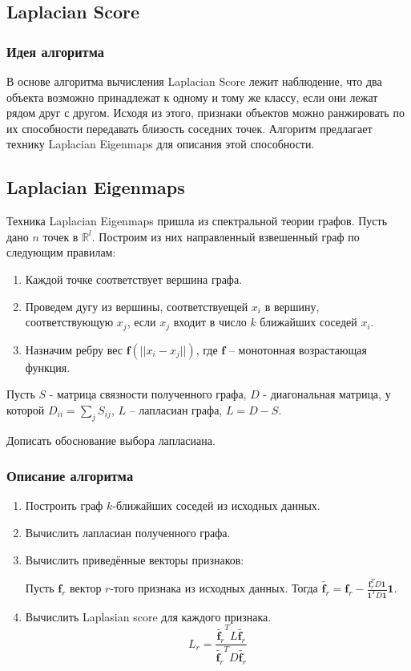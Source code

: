 \subsection{Laplacian Score}

\subsubsection{Идея алгоритма}

В основе алгоритма вычисления Laplacian Score лежит наблюдение, что два объекта возможно принадлежат к одному и тому же классу,
если они лежат рядом друг с другом. Исходя из этого, признаки объектов можно ранжировать по их способности передавать близость соседних точек. Алгоритм предлагает технику Laplacian Eigenmaps для описания этой способности. 

\subsection{Laplacian Eigenmaps}

Техника Laplacian Eigenmaps пришла из спектральной теории графов. Пусть дано $n$ точек в $\mathbb{R}^l$. Построим из них направленный
взвешенный граф по следующим правилам:
\begin{enumerate}
	\item Каждой точке соответствует вершина графа.
	\item Проведем дугу из вершины, соответствуещей $x_i$ в вершину, соответствующую $x_j$, если $x_j$ входит в число $k$ ближайших соседей
	$x_i$.
	\item Назначим ребру вес $\mathbf{f}(||x_i - x_j||)$, где $\mathbf{f}$ -- монотонная возрастающая функция.
\end{enumerate}
Пусть $S$ - матрица связности полученного графа, $D$  - диагональная матрица, у которой $D_{ii} = \sum_j S_{ij}$, $L$ -- лапласиан графа, $L = D-S$. 

Дописать обоснование выбора лапласиана.

\subsubsection{Описание алгоритма}

\begin{enumerate}
	\item Построить граф $k$-ближайших соседей из исходных данных. 
	\item Вычислить лапласиан полученного графа.
	\item Вычислить приведённые векторы признаков: 

	Пусть $\mathbf{f}_r$ вектор $r$-того признака из исходных данных. Тогда $\widetilde{\mathbf{f}_r} = \mathbf{f}_r - \frac{\mathbf{f}_r^T D \mathbf{1}}{\mathbf{1}^T D \mathbf{1}} \mathbf{1}$.
	\item Вычислить Laplasian score для каждого признака.
	\[L_r = \frac{\widetilde{\mathbf{f}_r}^T L \widetilde{\mathbf{f}_r}}{\widetilde{\mathbf{f}_r}^T D \widetilde{\mathbf{f}_r}}\]
\end{enumerate}

